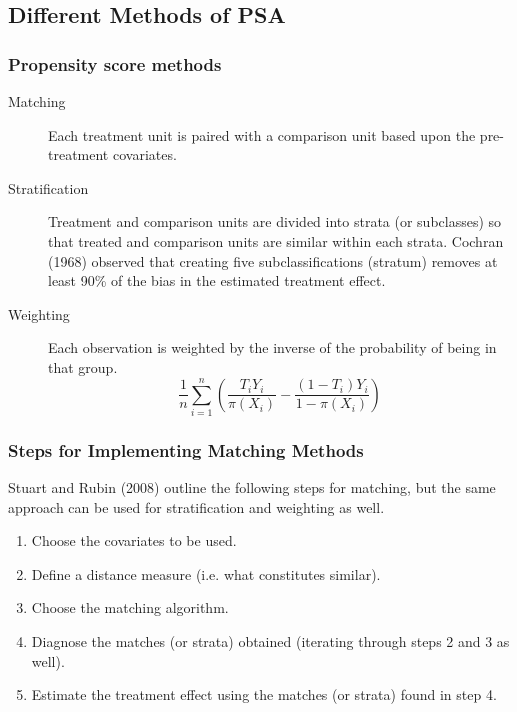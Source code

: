 \documentclass[10pt,slidestop,mathserif,c]{beamer}
\begin{document}
\subsection{Different Methods of PSA}

\begin{frame}
    \frametitle{Propensity score methods}
    \begin{description}
        \item[Matching] Each treatment unit is paired with a comparison unit based upon the pre-treatment covariates.
        \item[Stratification] Treatment and comparison units are divided into strata (or subclasses) so that treated and comparison units are similar within each strata. Cochran (1968) observed that creating five subclassifications (stratum) removes at least 90\% of the bias in the estimated treatment effect.
        \item[Weighting] Each observation is weighted by the inverse of the probability of being in that group.
        $$\frac { 1 }{ n } \sum _{ i=1 }^{ n }{ \left( \frac { { T }_{ i }{ Y }_{ i } }{ \pi ({ X }_{ i }) } -\frac { (1-{ T }_{ i }){ Y }_{ i } }{ 1-\pi ({ X }_{ i }) }  \right)  } $$
    \end{description}

\end{frame}

\begin{frame}
    \frametitle{Steps for Implementing Matching Methods}
    Stuart and Rubin (2008) outline the following steps for matching, but the same approach can be used for stratification and weighting as well.
    \begin{enumerate}
        \item Choose the covariates to be used.
        \item Define a distance measure (i.e. what constitutes similar).
        \item Choose the matching algorithm.
        \item Diagnose the matches (or strata) obtained (iterating through steps 2 and 3 as well).
        \item Estimate the treatment effect using the matches (or strata) found in step 4.
    \end{enumerate}

\end{frame}
\end{document}
